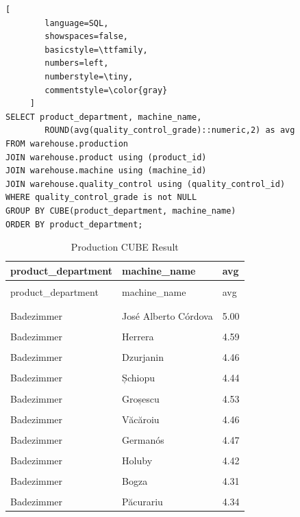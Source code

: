 \documentclass[letterpaper,12pt]{article}
\begin{document}
\begin{lstlisting}[
        language=SQL,
        showspaces=false,
        basicstyle=\ttfamily,
        numbers=left,
        numberstyle=\tiny,
        commentstyle=\color{gray}
     ]
SELECT product_department, machine_name, 
        ROUND(avg(quality_control_grade)::numeric,2) as avg
FROM warehouse.production
JOIN warehouse.product using (product_id)
JOIN warehouse.machine using (machine_id)
JOIN warehouse.quality_control using (quality_control_id)
WHERE quality_control_grade is not NULL
GROUP BY CUBE(product_department, machine_name)
ORDER BY product_department;	
\end{lstlisting}

\begingroup
\renewcommand\arraystretch{0.5}
\begin{longtable}{p{4cm}p{4cm}p{2cm}}
        \caption{Production CUBE Result} \\
	product\_department & machine\_name & avg \\
        \endfirsthead \\
        product\_department & machine\_name & avg \\
        \endhead \\
        \hline \\
        Badezimmer & José Alberto Córdova & 5.00 \\
        \hline \\
        Badezimmer & Herrera & 4.59 \\
        \hline \\
        Badezimmer & Dzurjanin & 4.46 \\
        \hline \\
        Badezimmer & Șchiopu & 4.44 \\
        \hline \\
        Badezimmer & Groșescu & 4.53 \\
        \hline \\
        Badezimmer & Văcăroiu & 4.46 \\
        \hline \\
        Badezimmer & Germanós & 4.47 \\
        \hline \\
        Badezimmer & Holuby & 4.42 \\
        \hline \\
        Badezimmer & Bogza & 4.31 \\
        \hline \\
        Badezimmer & Păcurariu & 4.34 \\

\end{longtable}
\end{document}
